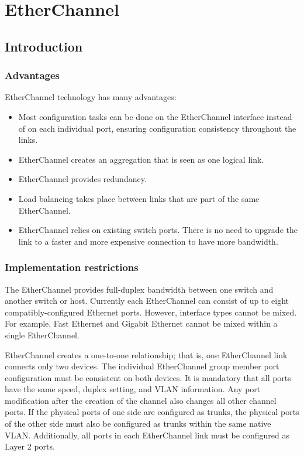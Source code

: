 \chapter{EtherChannel}
\section{Introduction}
\subsection{Advantages}
EtherChannel technology has many advantages:
\begin{itemize}
\item Most configuration tasks can be done on the EtherChannel interface instead of on each individual port, ensuring configuration consistency throughout the links.
\item EtherChannel creates an aggregation that is seen as one logical link. 
\item EtherChannel provides redundancy.
\item Load balancing takes place between links that are part of the same EtherChannel. 
\item EtherChannel relies on existing switch ports. There is no need to upgrade the link to a faster and more expensive connection to have more bandwidth.
\end{itemize}
\subsection{Implementation restrictions}
The EtherChannel provides full-duplex bandwidth between one switch and another switch or host. Currently each EtherChannel can consist of up to eight compatibly-configured Ethernet ports. However, interface types cannot be mixed. For example, Fast Ethernet and Gigabit Ethernet cannot be mixed within a single EtherChannel.\par 
EtherChannel creates a one-to-one relationship; that is, one EtherChannel link connects only two devices. The individual EtherChannel group member port configuration must be consistent on both devices. It is mandatory that all ports have the same speed, duplex setting, and VLAN information. Any port modification after the creation of the channel also changes all other channel ports. If the physical ports of one side are configured as trunks, the physical ports of the other side must also be configured as trunks within the same native VLAN. Additionally, all ports in each EtherChannel link must be configured as Layer 2 ports. 

